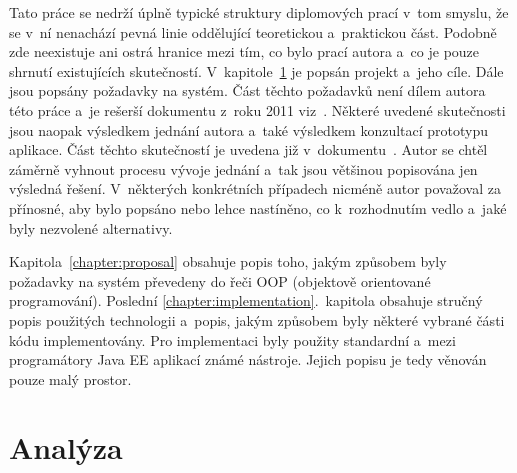 \documentclass[11pt, draft, oneside]{fithesis2}
\begin{document}
Tato práce se nedrží úplně typické struktury diplomových prací v~tom smyslu, že se v~ní nenachází pevná linie oddělující teoretickou a~praktickou část. Podobně zde neexistuje ani ostrá hranice mezi tím, co bylo prací autora a~co je pouze shrnutí existujících skutečností. V~kapitole~\ref{chapter:analysis} je popsán projekt a~jeho cíle. Dále jsou popsány požadavky na systém. Část těchto požadavků není dílem autora této práce a~je rešerší dokumentu z~roku 2011 viz~\cite{ARCH_2011_12_29}. Některé uvedené skutečnosti jsou naopak výsledkem jednání autora a~také výsledkem konzultací prototypu aplikace. Část těchto skutečností je uvedena již v~dokumentu~\cite{ARCH_2014_1_25}. Autor se chtěl záměrně vyhnout  procesu vývoje jednání a~tak jsou většinou popisována jen výsledná řešení. V~některých konkrétních případech nicméně autor považoval za přínosné, aby bylo popsáno nebo lehce nastíněno, co k~rozhodnutím vedlo a~jaké byly nezvolené alternativy.

Kapitola~\ref{chapter:proposal} obsahuje popis toho, jakým způsobem byly požadavky na systém převedeny do řeči OOP (objektově orientované programování). Poslední \ref{chapter:implementation}.~kapitola obsahuje stručný popis použitých technologii a~popis, jakým způsobem byly některé vybrané části kódu implementovány. Pro implementaci byly použity standardní a~mezi programátory Java EE aplikací známé nástroje. Jejich popisu je tedy věnován pouze malý prostor.









\chapter{Analýza}\label{chapter:analysis}

\end{document}
